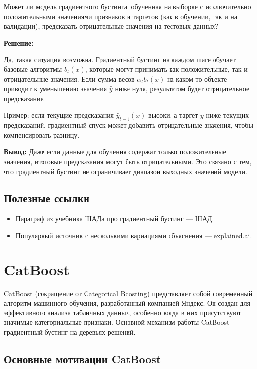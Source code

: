 Может ли модель градиентного бустинга, обученная на выборке с исключительно положительными значениями признаков и таргетов (как в обучении, так и на валидации), предсказать отрицательные значения на тестовых данных?

\textbf{Решение:}

Да, такая ситуация возможна. Градиентный бустинг на каждом шаге обучает базовые алгоритмы $b_t(x)$, которые могут принимать как положительные, так и отрицательные значения. Если сумма весов $\alpha_t b_t(x)$ на каком-то объекте приводит к уменьшению значения $\hat{y}$ ниже нуля, результатом будет отрицательное предсказание.

Пример: если текущие предсказания $\hat{y}_{t-1}(x)$ высоки, а таргет $y$ ниже текущих предсказаний, градиентный спуск может добавить отрицательные значения, чтобы компенсировать разницу.

\textbf{Вывод:} Даже если данные для обучения содержат только положительные значения, итоговые предсказания могут быть отрицательными. Это связано с тем, что градиентный бустинг не ограничивает диапазон выходных значений модели.

\subsection{Полезные ссылки}
\begin{itemize}
    \item Параграф из учебника ШАДа про градиентный бустинг — \href{https://education.yandex.ru/handbook/ml/article/gradientnyj-busting}{ШАД}.
    \item Популярный источник с несколькими вариациями объяснения — \href{https://explained.ai/gradient-boosting/}{explained.ai}.
\end{itemize}

\section{CatBoost}

CatBoost (сокращение от Categorical Boosting) представляет собой современный алгоритм машинного обучения, разработанный компанией Яндекс. Он создан для эффективного анализа табличных данных, особенно когда в них присутствуют значимые категориальные признаки. Основной механизм работы CatBoost — градиентный бустинг на деревьях решений.

\subsection*{Основные мотивации CatBoost}

